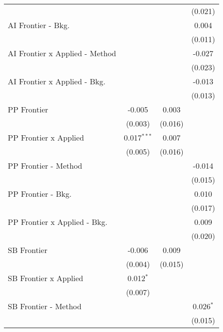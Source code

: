 \begin{tabular}{lccc}
                                  &               &         & (0.021)\\   
   AI Frontier - Bkg.             &               &         & 0.004\\   
                                  &               &         & (0.011)\\   
   AI Frontier x Applied - Method &               &         & -0.027\\   
                                  &               &         & (0.023)\\   
   AI Frontier x Applied - Bkg.   &               &         & -0.013\\   
                                  &               &         & (0.013)\\   
   PP Frontier                    & -0.005        & 0.003   &   \\   
                                  & (0.003)       & (0.016) &   \\   
   PP Frontier x Applied          & 0.017$^{***}$ & 0.007   &   \\   
                                  & (0.005)       & (0.016) &   \\   
   PP Frontier - Method           &               &         & -0.014\\   
                                  &               &         & (0.015)\\   
   PP Frontier - Bkg.             &               &         & 0.010\\   
                                  &               &         & (0.017)\\   
   PP Frontier x Applied - Bkg.   &               &         & 0.009\\   
                                  &               &         & (0.020)\\   
   SB Frontier                    & -0.006        & 0.009   &   \\   
                                  & (0.004)       & (0.015) &   \\   
   SB Frontier x Applied          & 0.012$^{*}$   &         &   \\   
                                  & (0.007)       &         &   \\   
   SB Frontier - Method           &               &         & 0.026$^{*}$\\   
                                  &               &         & (0.015)\\   

\end{tabular}
